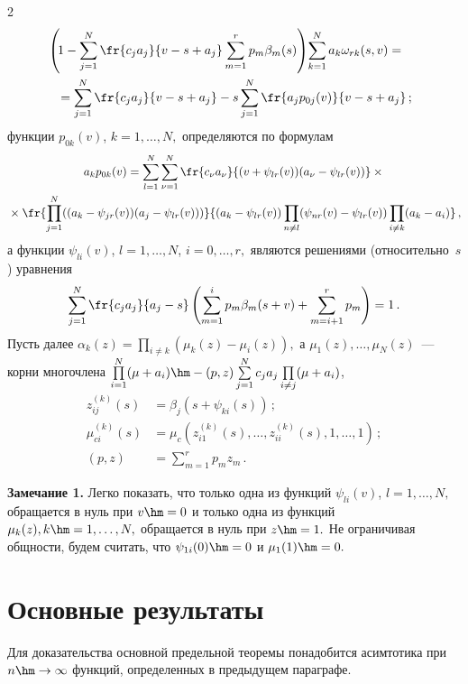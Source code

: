 \begin{multicols}{2}
\noindent
\begin{multline}
\hspace*{-12pt}\left(\!1-\sum\limits_{j=1}^N\fr{c_ja_j}{v-s+a_j}\sum\limits_{m=1}^rp_m
\beta_m(s)\right)\!
\sum\limits_{k=1}^N a_k \omega_{rk}(s,v)={}\\
{}=
\sum\limits_{j=1}^N\fr{c_ja_j}{v-s+a_j}-s\sum\limits_{j=1}^N\fr{a_jp_{0j}(v)}{v-s+a_j}\,;
\label{5}
\end{multline}
функции $p_{0k}(v)$, $k=1,\ldots,N,$ определяются по формулам
\begin{multline*}
a_k p_{0k}(v)=\sum\limits_{l=1}^N\sum\limits_{\nu=1}^N\fr{c_{\nu}a_{\nu}}
{(v+\psi_{lr}(v))(a_{\nu}-\psi_{lr}(v))}\times{}\\
{}\times
\fr{\prod\limits_{j=1}^N((a_k-\psi_{jr}(v))(a_j-\psi_{lr}(v)))}{(a_k-\psi_{lr}(v))
\prod\limits_{n\ne l}(\psi_{nr}(v)-\psi_{lr}(v))
\prod\limits_{i\ne k}(a_k-a_i)}\,,
\end{multline*}
а функции $\psi_{li}(v)$, $l=1,\ldots,N$, $i=0,\ldots,r,$ являются решениями 
(относительно~$s$) уравнения
\begin{equation*}
\sum\limits_{j=1}^N\fr{c_ja_j}{a_j-s}\left(\sum\limits_{m=1}^ip_m\beta_m(s+v)+
\sum\limits_{m=i+1}^rp_m\right)=1\,.
\end{equation*}
Пусть далее
$\alpha_k(z)=\prod\limits_{i\ne k}(\mu_k(z)-\mu_i(z)),$ а $\mu_1(z),\ldots,\mu_N(z)$~--- 
корни многочлена
$
\prod\limits_{i=1}^N(\mu+a_i)\hm-(p,z) \sum\limits_{j=1}^Nc_ja_j\prod\limits_{i\ne j}(\mu+a_i)$,
\begin{align*}
z_{ij}^{(k)}(s)&=\beta_j(s+\psi_{ki}(s))\,;\\
\mu_{ci}^{(k)}(s)&=\mu_c(z_{i1}^{(k)}(s),\ldots,z_{ii}^{(k)}(s),1,\ldots,1)\,;\\
(p,z)&=\sum\limits_{m=1}^rp_m z_m\,.
\end{align*}

\smallskip

\noindent
\textbf{Замечание 1.} 
Легко показать, что только одна из функций $\psi_{li}(v)$, $l=1,\ldots,N,$ 
обращается в нуль при $v\hm=0$ и только одна
из функций $\mu_k(z),k\hm=1,\ldots,N,$ обращается в нуль при $z\hm=1.$ Не ограничивая
общности, будем считать, что $\psi_{1i}(0)\hm=0$ и $\mu_1(1)\hm=0.$

\section{Основные результаты}

Для доказательства основной предельной теоремы понадобится
асимтотика при $n \hm\rightarrow \infty$ функций, определенных в
предыдущем параграфе.


\end{multicols}
